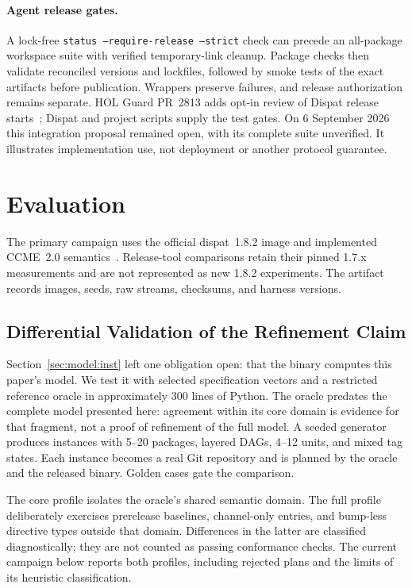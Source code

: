 \documentclass[sigconf,nonacm]{acmart}
\newcommand{\code}[1]{\texttt{#1}}
\begin{document}
\paragraph{Agent release gates.}
A lock-free \code{status --require-release --strict} check can precede
an all-package workspace suite with verified temporary-link cleanup.
Package checks then validate reconciled versions and lockfiles, followed by
smoke tests of the exact artifacts before publication. Wrappers preserve
failures, and release authorization remains separate.
HOL Guard PR~2813 adds opt-in review of Dispat release starts~\cite{guard};
Dispat and project scripts supply the test gates. On 6 September 2026 this
integration proposal remained open, with its complete suite unverified.
It illustrates implementation use, not deployment or another protocol guarantee.

\section{Evaluation}
\label{sec:eval}

The primary campaign uses the official dispat~1.8.2 image and implemented
CCME~2.0 semantics~\cite{ccme2}. Release-tool comparisons retain their pinned
1.7.x measurements and are not represented as new 1.8.2 experiments. The
artifact records images, seeds, raw streams, checksums, and harness versions.

\subsection{Differential Validation of the Refinement Claim}
\label{sec:eval:diff}

Section~\ref{sec:model:inst} left one obligation open: that the binary
computes this paper's model. We test it with selected specification vectors and a restricted reference
oracle in approximately 300 lines of Python. The oracle predates the complete
model presented here: agreement within its core domain is evidence for that
fragment, not a proof of refinement of the full model. A seeded generator
produces instances with 5--20 packages, layered DAGs, 4--12 units, and mixed
tag states. Each instance becomes a real Git repository and is planned by
the oracle and the released binary. Golden cases gate the comparison.

The core profile isolates the oracle's shared semantic domain. The full
profile deliberately exercises prerelease baselines, channel-only entries,
and bump-less directive types outside that domain. Differences in the latter
are classified diagnostically; they are not counted as passing conformance
checks. The current campaign below reports both profiles, including rejected
plans and the limits of its heuristic classification.
\end{document}
